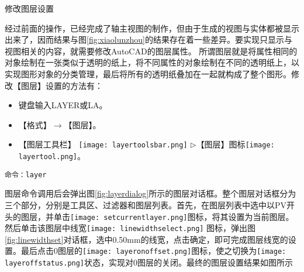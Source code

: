 \begin{procedure}

\item 修改图层设置

经过前面的操作，已经完成了轴主视图的制作，但由于生成的视图与实体都被显示出来了，因而结果与图\ref{fig:xiaolunzhou}的结果存在着一些差异。要实现只显示与视图相关的内容，就需要修改AutoCAD的图层属性。 所谓图层就是将属性相同的对象绘制在一张类似于透明的纸上，将不同属性的对象绘制在不同的透明纸上，以实现图形对象的分类管理，最后将所有的透明纸叠加在一起就构成了整个图形。修改【图层】设置的方法有：
\begin{itemize}
\item 键盘输入LAYER或LA。
\item 【格式】$\rightarrow$【图层】。
\item 【图层工具栏】 \texttt{[image: layertoolsbar.png]} $\triangleright$【图层】图标\texttt{[image: layertool.png]}。
\end{itemize}
\begin{lstlisting}
命令：layer
\end{lstlisting}
图层命令调用后会弹出图\ref{fig:layerdialog}所示的图层对话框。整个图层对话框分为三个部分，分别是工具区、过滤器和图层列表。首先，在图层列表中选中以PV开头的图层，并单击\texttt{[image: setcurrentlayer.png]}图标，将其设置为当前图层。然后单击该图层中线宽\texttt{[image: linewidthselect.png]} 图标，弹出图\ref{fig:linewidthset}对话框，选中0.50mm的线宽，点击确定，即可完成图层线宽的设置。最后点击0图层的\texttt{[image: layeronoffset.png]}图标，使之切换为\texttt{[image: layeroffstatus.png]}状态，实现对0图层的关闭。最终的图层设置结果如图所示


\end{procedure}
